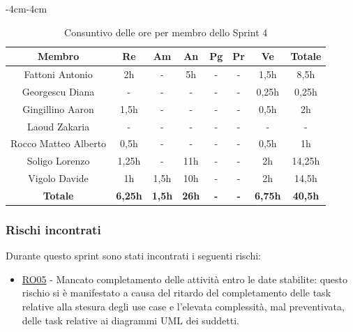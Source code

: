\documentclass[a4paper,12pt]{article}
\begin{document}
\begin{table}[H]
    \begin{adjustwidth}{-4cm}{-4cm}
    \centering
    \begin{tabular}{|c|c|c|c|c|c|c|c|}
        \hline
        \textbf{Membro} & \textbf{Re} & \textbf{Am}  & \textbf{An} & \textbf{Pg} & \textbf{Pr} & \textbf{Ve} & \textbf{Totale} \\
        \hline
        Fattoni Antonio & 2h & - & 5h & - & - & 1,5h & 8,5h \\
        \hline
        Georgescu Diana & - & - & - & - & - & 0,25h & 0,25h \\
        \hline
        Gingillino Aaron & 1,5h & - & - & - & - & 0,5h & 2h \\
        \hline
        Laoud Zakaria & - & - & - & - & - & - & - \\
        \hline
        Rocco Matteo Alberto & 0,5h & - & - & - & - & 0,5h & 1h \\
        \hline
        Soligo Lorenzo & 1,25h & - & 11h & - & - & 2h & 14,25h \\
        \hline
        Vigolo Davide & 1h & 1,5h & 10h & - & - & 2h & 14,5h \\
        \hline
        \textbf{Totale} & \textbf{6,25h} & \textbf{1,5h} & \textbf{26h} & \textbf{-} & \textbf{-} & \textbf{6,75h} & \textbf{40,5h} \\
        \hline
    \end{tabular}
    \caption{Consuntivo delle ore per membro dello Sprint 4}
    \end{adjustwidth}
\end{table}

\subsubsection{Rischi incontrati}
Durante questo sprint sono stati incontrati i seguenti rischi:
\begin{itemize}
    \item \hyperref[RO05]{RO05} - Mancato completamento delle attività entro le date stabilite: questo rischio si è manifestato a causa del ritardo del completamento delle task relative alla stesura degli use case e l'elevata complessità, mal preventivata, delle task relative ai diagrammi UML dei suddetti.
\end{itemize}
\end{document}
